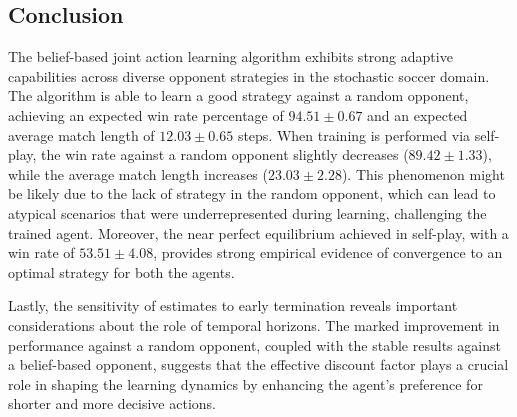 \documentclass[twocolumn, 9pt]{extarticle}
\begin{document}
\subsection{Conclusion}
The belief-based joint action learning algorithm exhibits strong adaptive capabilities across diverse opponent strategies in the stochastic soccer domain. 
The algorithm is able to learn a good strategy against a random opponent, achieving an expected win rate percentage of $94.51 \pm 0.67$ and an expected average match length of $12.03 \pm 0.65$ steps.
When training is performed via self-play, the win rate against a random opponent slightly decreases ($89.42 \pm 1.33$), while the 
average match length increases ($23.03 \pm 2.28$). This phenomenon might be likely due to the lack of strategy in the random opponent, which can lead to atypical scenarios 
that were underrepresented during learning, challenging the trained agent. Moreover, the near perfect equilibrium achieved in self-play, with a win rate of $53.51 \pm 4.08$, provides strong empirical evidence of convergence to an optimal strategy for both the agents.

Lastly, the sensitivity of estimates to early termination reveals important considerations about the role of temporal horizons. The marked improvement in performance 
against a random opponent, coupled with the stable results against a belief-based opponent, suggests that the effective discount factor plays 
a crucial role in shaping the learning dynamics by enhancing the agent's preference for shorter and more decisive actions.
\onecolumn
\newpage
\nocite{*}


\end{document}
